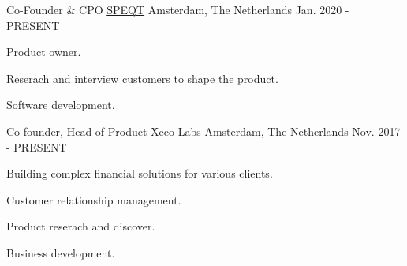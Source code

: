 

\begin{cventries}

  \cventry
    {Co-Founder \& CPO} %
    {\href{https://speqt.co}{SPEQT}} %
    {Amsterdam, The Netherlands} %
    {Jan. 2020 - PRESENT} %
    {
      \begin{cvitems} %
      \item {Product owner.}
      \item {Reserach and interview customers to shape the product.}
      \item {Software development.}
      \end{cvitems}
	}
  \cventry
    {Co-founder, Head of Product} %
    {\href{https://www.xecolabs.com}{Xeco Labs}} %
    {Amsterdam, The Netherlands} %
    {Nov. 2017 - PRESENT} %
    {
      \begin{cvitems} 
      \item {Building complex financial solutions for various clients.}
      \item {Customer relationship management.}
      \item {Product reserach and discover.}
      \item {Business development.}
      \end{cvitems}
    }



\end{cventries}
